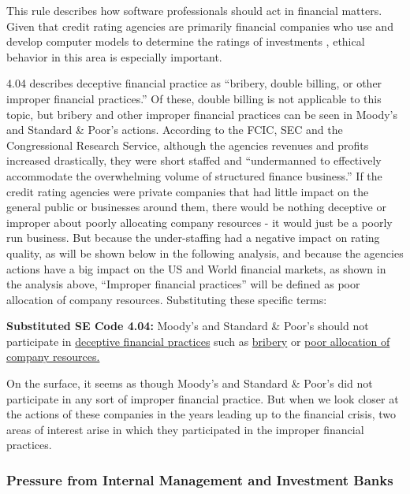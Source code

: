 \documentclass[11pt]{article}
\begin{document}
\begin{multicols}{2}
This rule describes how software professionals should act in financial matters.  Given that credit rating agencies are primarily financial companies who use and develop computer models to determine the ratings of investments \cite[p.11]{govtReport}, ethical behavior in this area is especially important.  

4.04 describes deceptive financial practice as ``bribery, double billing, or other improper financial practices.''  Of these, double billing is not applicable to this topic, but bribery and other improper financial practices can be seen in Moody's and Standard \& Poor's actions.  According to the FCIC, SEC and the Congressional Research Service, although the agencies revenues and profits increased drastically, they were short staffed and ``undermanned to effectively accommodate the overwhelming volume of structured finance business.'' \cite[p. 7]{CRS}\cite{govtReport}\cite{secCRAreport}  If the credit rating agencies were private companies that had little impact on the general public or businesses around them, there would be nothing deceptive or improper about poorly allocating company resources - it would just be a poorly run business.  But because the under-staffing had a negative impact on rating quality, as will be shown below in the following analysis, and because the agencies actions have a big impact on the US and World financial markets, as shown in the analysis above, ``Improper financial practices'' will be defined as poor allocation of company resources.  Substituting these specific terms:

\begin{framed}
\noindent
   \textbf{Substituted SE Code 4.04: } 
   \newline
   Moody's and Standard \& Poor's should not participate in \underline{deceptive financial practices} such as \underline{bribery} or \underline{poor allocation of company resources.}
\end{framed}

On the surface, it seems as though Moody's and Standard \& Poor's did not participate in any sort of improper financial practice.  But when we look closer at the actions of these companies in the years leading up to the financial crisis, two areas of interest arise in which they participated in the improper financial practices.  

\subsubsection{Pressure from Internal Management and Investment Banks}


\end{multicols}
\end{document}
